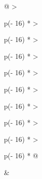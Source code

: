\begin{longtable}[]{@{}
  >{\raggedright\arraybackslash}p{(\columnwidth - 16\tabcolsep) * }
  >{\raggedright\arraybackslash}p{(\columnwidth - 16\tabcolsep) * }
  >{\raggedright\arraybackslash}p{(\columnwidth - 16\tabcolsep) * }
  >{\raggedright\arraybackslash}p{(\columnwidth - 16\tabcolsep) * }
  >{\raggedright\arraybackslash}p{(\columnwidth - 16\tabcolsep) * }
  >{\raggedright\arraybackslash}p{(\columnwidth - 16\tabcolsep) * }
  >{\raggedright\arraybackslash}p{(\columnwidth - 16\tabcolsep) * }
  >{\raggedright\arraybackslash}p{(\columnwidth - 16\tabcolsep) * }
  >{\raggedright\arraybackslash}p{(\columnwidth - 16\tabcolsep) * }@{}}
\toprule\noalign{}
 &
\end{longtable}
